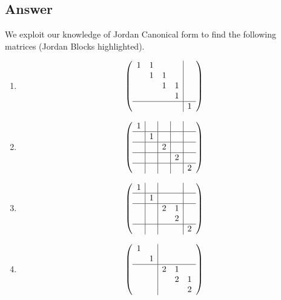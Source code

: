 \documentclass[11pt]{article}
\begin{document}
\subsection{Answer}
We exploit our knowledge of Jordan Canonical form to find the following matrices (Jordan Blocks highlighted).
\begin{enumerate}
\item \[\left(
\begin{array}{cccc|c}
 1 & 1 &  &  &  \\
  & 1 & 1 &  &  \\
  &  & 1 & 1 &  \\
  &  &  & 1 &  \\
 \hline
  &  &  &  & 1
\end{array}
\right)\]
\item \[\left(
\begin{array}{c|c|c|c|c}
 1 &  &  &  &  \\
 \hline
  & 1 &  &  &  \\
 \hline
  &  & 2 &  &  \\
 \hline
  &  &  & 2 &  \\
 \hline
  &  &  &  & 2
\end{array}
\right)\]
\item \[\left(
\begin{array}{c|c|cc|c}
 1 &  &  &  &  \\
 \hline
  & 1 &  &  &  \\
 \hline
  &  & 2 & 1 &  \\
  &  &  & 2 &  \\
 \hline
  &  &  &  & 2
\end{array}
\right)\]
\item \[\left(
\begin{array}{cc|ccc}
 1 &  &  &  &  \\
  & 1 &  &  &  \\
 \hline
  &  & 2 & 1 &  \\
  &  &  & 2 & 1 \\
  &  &  &  & 2
\end{array}
\right)\]
\end{enumerate}
\end{document}
